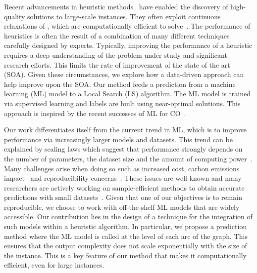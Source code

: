 \documentclass[3p, authoryear, times, doubleblind]{elsarticle}
\begin{document}
{%
Recent advancements in heuristic methods~\citep{gendron_matheuristics_2018, katayama_mip_2020} have enabled the discovery of high-quality solutions to large-scale instances. They often exploit continuous relaxations of \fcn, which are computationally efficient to solve~\citep{crainic_slope_2004, katayama_capacity_2009}. The performance of heuristics is often the result of a combination of many different techniques carefully designed by experts. Typically, improving the performance of a heuristic requires a deep understanding of the problem under study and significant research efforts. This limits the rate of improvement of the state of the art (SOA). Given these circumstances, we explore how a data-driven approach can help improve upon the SOA. Our method feeds a prediction from a machine learning (ML) model to a Local Search (LS) algorithm. The ML model is trained via supervised learning and labels are built using near-optimal solutions. This approach is inspired by the recent successes of ML for CO~\citep{bengio_machine_2021}. 

Our work differentiates itself from the current trend in ML, which is to improve performance via increasingly larger models and datasets.  This trend can be explained by scaling laws which suggest that performance strongly depends on the number of parameters, the dataset size and the amount of computing power~\citep{kaplan_scaling_2020}. Many challenges arise when doing so such as increased cost, carbon emissions impact~\citep{dhar_carbon_2020} and reproducibility concerns~\citep{albertoni_reproducibility_2023}. These issues are well known and many researchers are actively working on sample-efficient methods to obtain accurate predictions with small datasets~\citep{wallingford_neural_2023, robinson_la_rocca_one-shot_2024}. Given that one of our objectives is to remain reproducible, we choose to work with off-the-shelf ML models that are widely accessible. Our contribution lies in the design of a technique for the integration of such models within a heuristic algorithm. In particular, we propose a prediction method where the ML model is called at the level of each arc of the graph. This ensures that the output complexity does not scale exponentially with the size of the instance. This is a key feature of our method that makes it computationally efficient, even for large instances. 


}
\end{document}
